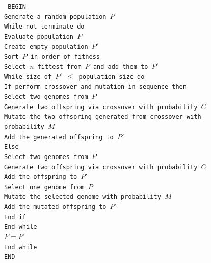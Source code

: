 \renewcommand{\baselinestretch}{1.0}

\begin{figure}[htbp]
\begin{center}
\begin{varwidth}{\textwidth}
{\tt
BEGIN \\
\tab Generate a random population $P$ \\
\tab While not terminate do \\
\tab \tab Evaluate population $P$ \\
\tab \tab Create empty population $P'$ \\
\tab \tab Sort $P$ in order of fitness \\
\tab \tab Select $n$ fittest from $P$ and add them to $P'$ \\
\tab \tab While size of $P'$ $\leq$ population size do \\
\tab \tab \tab If perform crossover and mutation in sequence then \\
\tab \tab \tab \tab Select two genomes from $P$ \\
\tab \tab \tab \tab Generate two offspring via crossover with probability $C$ \\
\tab \tab \tab \tab Mutate the two offspring generated from crossover with probability $M$ \\
\tab \tab \tab \tab Add the generated offspring to $P'$ \\
\tab \tab \tab Else \\
\tab \tab \tab \tab Select two genomes from $P$ \\
\tab \tab \tab \tab Generate two offspring via crossover with probability $C$ \\
\tab \tab \tab \tab Add the offspring to $P'$ \\
\tab \tab \tab \tab Select one genome from $P$ \\
\tab \tab \tab \tab Mutate the selected genome with probability $M$ \\
\tab \tab \tab \tab Add the mutated offspring to $P'$ \\
\tab \tab \tab End if \\
\tab \tab End while \\
\tab \tab $P=P'$ \\
\tab End while \\
END \\
}

\end{varwidth}
\end{center}
\end{figure}
